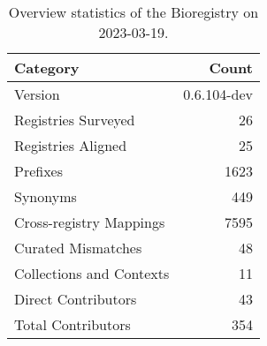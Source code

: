 \begin{table}
\centering
\caption{Overview statistics of the Bioregistry on 2023-03-19.}
\label{tab:bioregistry-summary}
\begin{tabular}{lr}
\toprule
                Category &       Count \\
\midrule
                 Version & 0.6.104-dev \\
     Registries Surveyed &          26 \\
      Registries Aligned &          25 \\
                Prefixes &        1623 \\
                Synonyms &         449 \\
 Cross-registry Mappings &        7595 \\
      Curated Mismatches &          48 \\
Collections and Contexts &          11 \\
     Direct Contributors &          43 \\
      Total Contributors &         354 \\
\bottomrule
\end{tabular}
\end{table}

